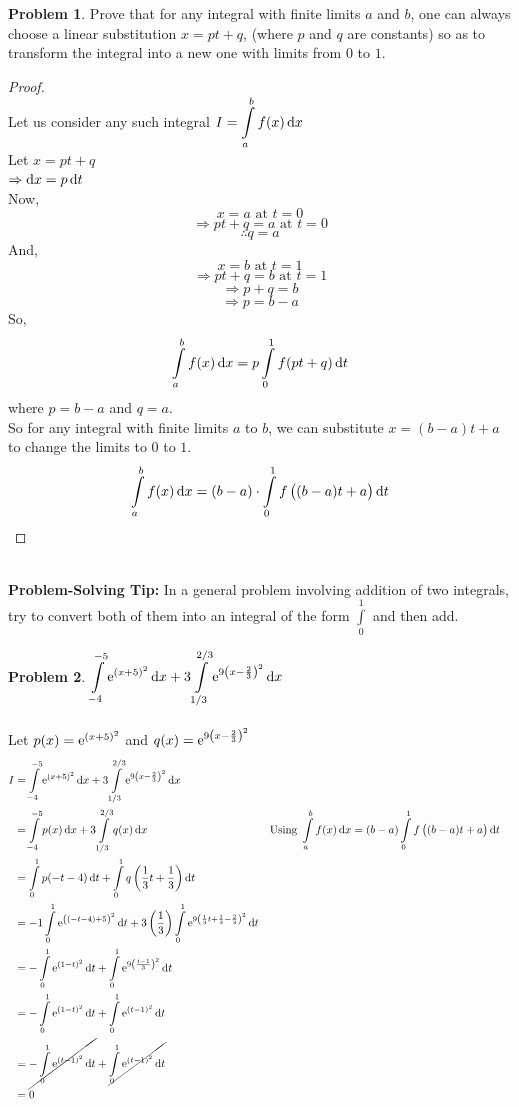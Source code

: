 \documentclass[14]{article}
\theoremstyle{definition}
\newtheorem{prob}{Problem}
\theoremstyle{case}
\begin{document}
\pagebreak
\begin{prob}
Prove that for any integral with finite limits $a$ and $b$, one can always choose a linear substitution $x = pt + q$, (where $p$ and $q$ are constants) so as to transform the integral into a new one with limits from $0$ to $1$.
\begin{proof}\text{ }\\
Let us consider any such integral $I = \displaystyle\int\limits_a^b f(x) \dif x$\\
Let $x = pt + q$\\
$\Rightarrow \dif x = p \dif t$\\
Now,
\[x = a \text{ at } t = 0\]
\[\Rightarrow pt+q = a \text{ at } t = 0\]
\[\therefore q = a\]
And,
\[x = b \text{ at } t = 1\]
\[\Rightarrow pt+q = b \text{ at } t = 1\]
\[\Rightarrow p + q = b\]
\[\Rightarrow p = b - a\]
So,
\[\int\limits_a^b f(x) \dif x = p \int\limits_0^1 f(pt+q) \dif t\]
where $p = b - a$ and $q = a$.\\
So for any integral with finite limits $a$ to $b$, we can substitute $x = (b-a)t + a$ to change the limits to $0$ to $1$.
\[\int\limits_a^b f(x) \dif x = (b-a) \cdot \int\limits_0^1 f\left((b-a)t + a\right) \dif t\]
\end{proof}\text{}\\
\textbf{Problem-Solving Tip: } In a general problem involving addition of two integrals, try to convert both of them into an integral of the form $\displaystyle\int\limits_0^1$ and then add.
\end{prob}
\pagebreak
\begin{prob}
$\displaystyle\int\limits_{-4}^{-5} {\rm e}^{(x+5)^2} \dif x + 3\int\limits_{1/3}^{2/3} {\rm e}^{9\left(x - \frac23\right)^2}\dif x$\\\\
Let $p(x) = {\rm e}^{(x+5)^2}$ and $q(x) = {\rm e}^{9\left(x - \frac23\right)^2}$
\begin{align*}
I &= \int\limits_{-4}^{-5} {\rm e}^{(x+5)^2} \dif x + 3\int\limits_{1/3}^{2/3} {\rm e}^{9\left(x - \frac23\right)^2}\dif x\\
&= \int\limits_{-4}^{-5} p(x) \dif x + 3\int\limits_{1/3}^{2/3} q(x) \dif x && \text{Using } \displaystyle\int\limits_a^b f(x) \dif x = (b-a) \int\limits_0^1 f\left( (b-a)t + a \right)\dif t\\
&= \int\limits_0^1 p(-t-4) \dif t + \int\limits_0^1 q\left( \dfrac13 t + \dfrac13 \right) \dif t\\
&= -1\int\limits_0^1 {\rm e}^{\left( (-t-4) + 5 \right)^2} \dif t + 3 \left( \dfrac13 \right) \int\limits_0^1 {\rm e}^{9\left(\frac13 t + \frac13 - \frac23\right)^2}\dif t\\
&= -\int\limits_0^1 {\rm e}^{\left( 1-t \right)^2} \dif t +  \int\limits_0^1 {\rm e}^{9\left(\frac{t-1}{3} \right)^2}\dif t\\
&= -\int\limits_0^1 {\rm e}^{\left( 1-t \right)^2} \dif t + \int\limits_0^1 {\rm e}^{\left( t-1 \right)^2}\dif t\\
&= \cancel{-\int\limits_0^1 {\rm e}^{\left( t-1 \right)^2} \dif t} +  \cancel{\int\limits_0^1 {\rm e}^{\left( t-1 \right)^2}\dif t}\\
&= 0
\end{align*}
\end{prob}
\end{document}
